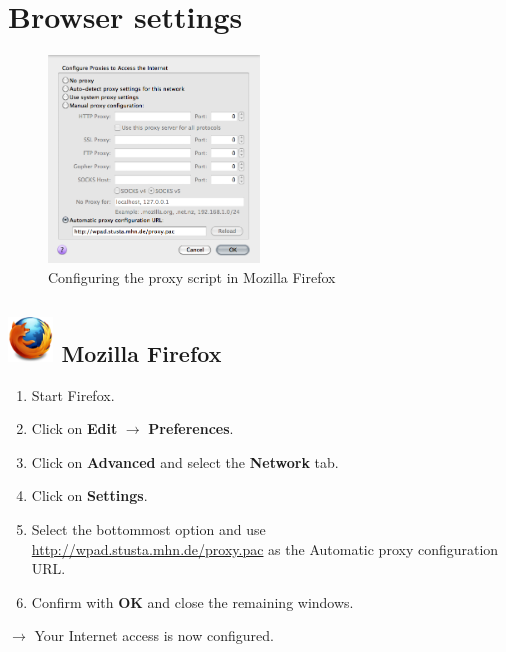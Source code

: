 \documentclass[a4paper,12pt]{scrartcl}
\newcommand{\optemph}[1]{\textbf{#1}}
\begin{document}
\newpage

\section*{Browser settings}

\begin{figure}
  \vspace{-30pt}
  \begin{center}
    \includegraphics[width=0.5\textwidth,keepaspectratio]{Bilder/Proxy_Firefox_EN}
  \end{center}
  \caption{Configuring the proxy script in Mozilla Firefox}
\end{figure}

\subsection*{\includegraphics[height=1.2cm,keepaspectratio]{Bilder/Firefox_35_logo} Mozilla Firefox}
\begin{enumerate}
    \item Start Firefox.
	\item Click on \optemph{Edit} $\rightarrow$ \optemph{Preferences}.
	\item Click on \optemph{Advanced} and select the \optemph{Network} tab.
	\item Click on \optemph{Settings}.
    \item Select the bottommost option and use \\ \url{http://wpad.stusta.mhn.de/proxy.pac} as the Automatic proxy configuration URL.
	\item Confirm with \optemph{OK} and close the remaining windows.
\end{enumerate}
$\rightarrow$ Your Internet access is now configured.
\end{document}
